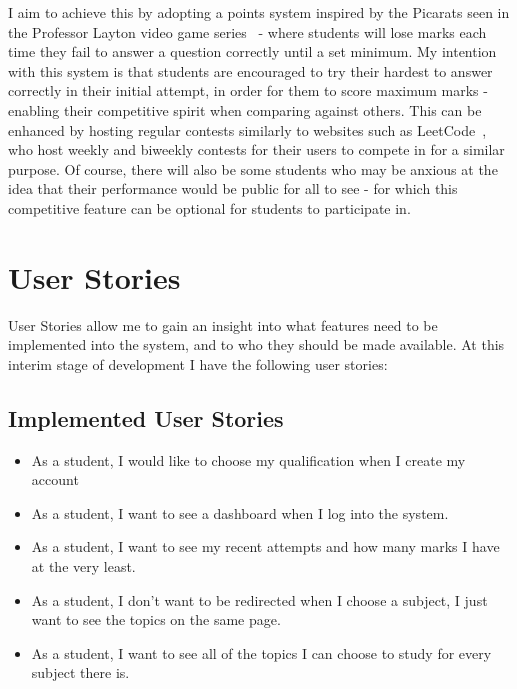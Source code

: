\documentclass[]{final_report}
\begin{document}
I aim to achieve this by adopting a points system inspired by the Picarats seen in the Professor Layton video game series~\cite{LAYTON} - where students will lose marks each time they fail to answer a question correctly until a set minimum. My intention with this system is that students are encouraged to try their hardest to answer correctly in their initial attempt, in order for them to score maximum marks - enabling their competitive spirit when comparing against others. This can be enhanced by hosting regular contests similarly to websites such as LeetCode~\cite{LEETCODE}, who host weekly and biweekly contests for their users to compete in for a similar purpose. Of course, there will also be some students who may be anxious at the idea that their performance would be public for all to see - for which this competitive feature can be optional for students to participate in. 

\section{User Stories}

User Stories allow me to gain an insight into what features need to be implemented into the system, and to who they should be made available. At this interim stage of development I have the following user stories:

\subsection{Implemented User Stories}
	\begin{itemize}
		\item As a student, I would like to choose my qualification when I create my account
		\item As a student, I want to see a dashboard when I log into the system.
		\item As a student, I want to see my recent attempts and how many marks I have at the very least.
		\item As a student, I don't want to be redirected when I choose a subject, I just want to see the topics on the same page.
		\item As a student, I want to see all of the topics I can choose to study for every subject there is.
		
	\end{itemize}
\end{document}
